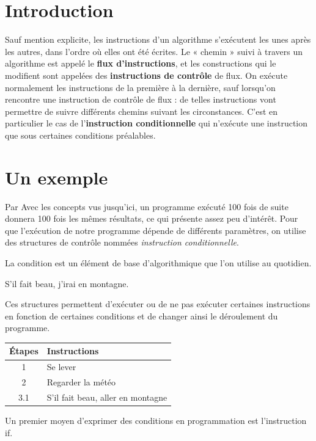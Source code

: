 
\vspace{-0.8cm}
\section{Introduction}
Sauf mention explicite, les instructions d’un algorithme s’exécutent les unes après les autres, dans l’ordre où elles ont été écrites. Le « chemin » suivi à travers un algorithme est appelé le \textbf{flux d’instructions}, et les constructions qui le modifient sont appelées des \textbf{instructions de contrôle} de flux. On exécute normalement les instructions de la première à la dernière, sauf lorsqu’on rencontre une instruction de contrôle de flux : de telles instructions vont permettre de suivre différents chemins suivant les circonstances. C’est en particulier le cas de l’\textbf{instruction conditionnelle} qui n’exécute une instruction que sous certaines conditions préalables. 

\section{Un exemple}
Par Avec les concepts vus jusqu'ici, un programme exécuté 100 fois de suite donnera 100 fois les mêmes résultats, ce qui présente assez peu d'intérêt. Pour que l'exécution de notre programme dépende de différents paramètres, on utilise des structures de contrôle nommées \textit{instruction conditionnelle}.

La condition est un élément de base d'algorithmique que l'on utilise au quotidien.
\begin{myexample}
	S'il fait beau, j'irai en montagne. 
\end{myexample}
Ces structures permettent d'exécuter ou de ne pas exécuter certaines instructions en fonction de certaines conditions et de changer ainsi le déroulement du programme.


\begin{tabular}{ c  l  }
	Étapes & Instructions \\ \hline
	1 & Se lever  \\ 
	2 & Regarder la météo  \\
	3.1 & S'il fait beau, aller en montagne  \\
\end{tabular}

Un premier moyen d'exprimer des conditions en programmation est l'instruction \textsf{if}. 

